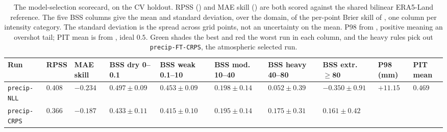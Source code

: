 \begin{table}[H]
\centering
\caption[Model-selection scorecard, all five precipitation runs]{The model-selection scorecard, on
the CV holdout. RPSS () and MAE skill () are both scored
against the shared bilinear ERA5-Land reference. The five BSS columns give the mean and standard
deviation, over the domain, of the per-point Brier skill of , one column per intensity category.
The standard deviation is the spread across grid points, not an
uncertainty on the mean. P98 from ,
positive meaning an overshot tail; PIT mean is from , ideal
$0.5$. Green shades the best and red the worst run in each column, and the heavy rules pick out
\texttt{precip-FT-CRPS}, the atmospheric selected run. }
\label{tab:single-precip-selection}
\scriptsize
\setlength{\tabcolsep}{1.5pt}
\renewcommand{\arraystretch}{1.25}
\begin{tabular}{|>{\raggedright\arraybackslash}p{2.1cm}|>{\centering\arraybackslash}p{0.9cm}|>{\centering\arraybackslash}p{0.9cm}|>{\centering\arraybackslash}p{1.6cm}|>{\centering\arraybackslash}p{1.6cm}|>{\centering\arraybackslash}p{1.6cm}|>{\centering\arraybackslash}p{1.6cm}|>{\centering\arraybackslash}p{1.6cm}|>{\centering\arraybackslash}p{0.9cm}|>{\centering\arraybackslash}p{0.85cm}|}
\hline
\textbf{Run} & \textbf{RPSS} & \textbf{MAE} \newline \textbf{skill} &
\textbf{BSS dry} \newline \textbf{0--0.1} & \textbf{BSS weak} \newline \textbf{0.1--10} &
\textbf{BSS mod.} \newline \textbf{10--40} &
\textbf{BSS heavy} \newline \textbf{40--80} & \textbf{BSS extr.} \newline $\mathbf{\geq 80}$ &
\textbf{P98} \newline \textbf{(mm)} & \textbf{PIT} \newline \textbf{mean} \\
\hline
\texttt{precip-NLL} & $0.408$ & \cellcolor{red!12}$-0.234$ & $0.497 \pm 0.09$ & $0.453 \pm 0.09$ &
$0.198 \pm 0.14$ &
\cellcolor{red!12}$0.052 \pm 0.39$ & \cellcolor{red!12}$-0.350 \pm 0.91$ &
\cellcolor{red!12}$+11.15$ & $0.469$ \\
\hline
\texttt{precip-CRPS} & \cellcolor{red!12}$0.366$ & $-0.187$ & \cellcolor{red!12}$0.433 \pm 0.11$ &
\cellcolor{red!12}$0.415 \pm 0.10$ & \cellcolor{red!12}$0.195 \pm 0.14$ & $0.175 \pm 0.31$ & \cellcolor{green!12}$0.161 \pm 0.42$ &

\end{tabular}
\end{table}
